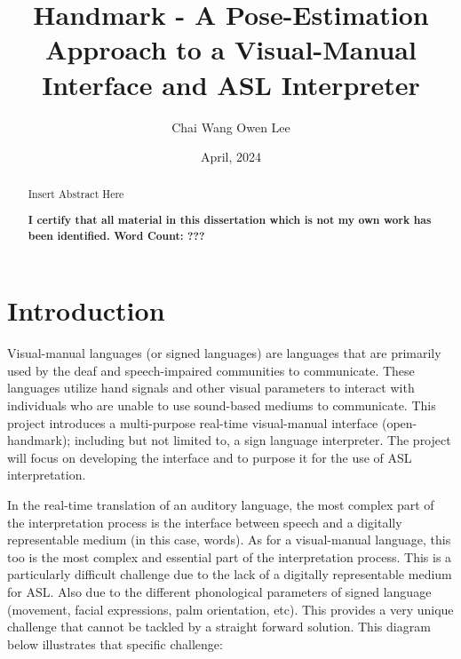\documentclass[11pt]{article}
\begin{document}
\title{Handmark - A Pose-Estimation Approach to a Visual-Manual Interface and ASL Interpreter}
\author{Chai Wang Owen Lee}

\date{April, 2024}
\maketitle

\begin{abstract}
    Insert Abstract Here
    \vspace*{\fill}

    \noindent 
    \textbf{I certify that all material in this dissertation which is not my own work has been identified. Word Count: ???}
\end{abstract}

\pagebreak
{}
\begingroup
  \flushbottom
  \setlength{\parskip}{0pt plus 1fil}%
  \tableofcontents
  \newpage
\endgroup

\pagebreak
\section{Introduction}
    Visual-manual languages (or signed languages) are languages that are primarily used by the deaf and speech-impaired communities to communicate. These languages utilize hand signals and other visual parameters to interact with individuals who are unable to use sound-based mediums to communicate. This project introduces a multi-purpose real-time visual-manual interface (open-handmark); including but not limited to, a sign language interpreter. The project will focus on developing the interface and to purpose it for the use of ASL interpretation.
    
    In the real-time translation of an auditory language, the most complex part of the interpretation process is the interface between speech and a digitally representable medium (in this case, words). As for a visual-manual language, this too is the most complex and essential part of the interpretation process. This is a particularly difficult challenge due to the lack of a digitally representable medium for ASL. Also due to the different phonological parameters of signed language (movement, facial expressions, palm orientation, etc). This provides a very unique challenge that cannot be tackled by a straight forward solution. This diagram below illustrates that specific challenge:
\end{document}
